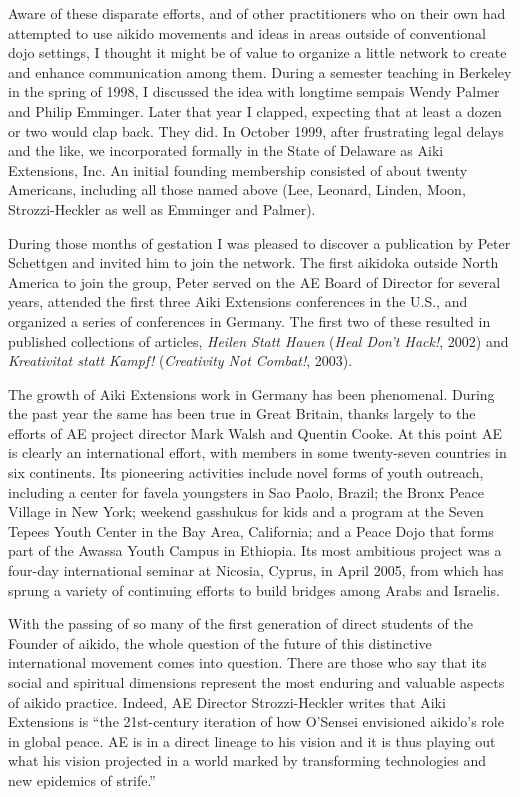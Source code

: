 Aware of these disparate efforts, and of other practitioners who on their own had attempted to use aikido movements and ideas in areas outside of conventional dojo settings, I thought it might be of value to organize a little network to create and enhance communication among them. During a semester teaching in Berkeley in the spring of 1998, I discussed the idea with longtime sempais Wendy Palmer and Philip Emminger. Later that year I clapped, expecting that at least a dozen or two would clap back. They did. In October 1999, after frustrating legal delays and the like, we incorporated formally in the State of Delaware as Aiki Extensions, Inc. An initial founding membership consisted of about twenty Americans, including all those named above (Lee, Leonard, Linden, Moon, Strozzi-Heckler as well as Emminger and Palmer).

During those months of gestation I was pleased to discover a publication by Peter Schettgen and invited him to join the network. The first aikidoka outside North America to join the group, Peter served on the AE Board of Director for several years, attended the first three Aiki Extensions conferences in the U.S., and organized a series of conferences in Germany. The first two of these resulted in published collections of articles, \emph{Heilen Statt Hauen} (\emph{Heal Don't Hack!}, 2002) and \emph{Kreativitat statt Kampf!} (\emph{Creativity Not Combat!}, 2003). 

The growth of Aiki Extensions work in Germany has been phenomenal. During the past year the same has been true in Great Britain, thanks largely to the efforts of AE project director Mark Walsh and Quentin Cooke. At this point AE is clearly an international effort, with members in some twenty-seven countries in six continents. Its pioneering activities include novel forms of youth outreach, including a center for favela youngsters in Sao Paolo, Brazil; the Bronx Peace Village in New York; weekend gasshukus for kids and a program at the Seven Tepees Youth Center in the Bay Area, California; and a Peace Dojo that forms part of the Awassa Youth Campus in Ethiopia. Its most ambitious project was a four-day international seminar at Nicosia, Cyprus, in April 2005, from which has sprung a variety of continuing efforts to build bridges among Arabs and Israelis.

With the passing of so many of the first generation of direct students of the Founder of aikido, the whole question of the future of this distinctive international movement comes into question. There are those who say that its social and spiritual dimensions represent the most enduring and valuable aspects of aikido practice. Indeed, AE Director Strozzi-Heckler writes that Aiki Extensions is ``the 21st-century iteration of how O'Sensei envisioned aikido's role in global peace. AE is in a direct lineage to his vision and it is thus playing out what his vision projected in a world marked by transforming technologies and new epidemics of strife.''

